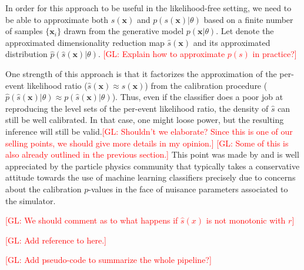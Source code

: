 \documentclass[12pt]{article}
\numberwithin{equation}{section}
\theoremstyle{plain}
\newcommand{\glnote}[1]{\textcolor{red}{[GL: #1]}}
\begin{document}
In order for this approach to be useful in the likelihood-free setting, we need
to be able to approximate both $s(\mathbf{x})$ and $p(s(\mathbf{x})|\theta)$
based on a finite number of samples $\{\mathbf{x}_i\}$ drawn from the generative
model $p(\mathbf{x}|\theta)$.
Let denote the approximated dimensionality
reduction map $\hat{s}(\mathbf{x})$ and its approximated distribution
$\hat{p}(\hat{s}(\mathbf{x})|\theta)$. \glnote{Explain how to approximate $p(s)$ in practice?}

One strength of this approach is that it factorizes the approximation of the
per-event likelihood ratio ($\hat{s}(\mathbf{x}) \approx s(\mathbf{x})$) from
the calibration procedure ($\hat p(\hat s(\mathbf{x})| \theta) \approx
p(\hat{s}(\mathbf{x})|\theta)$). Thus, even if the classifier does a poor job at
reproducing the level sets of the per-event likelihood ratio, the density of
$\hat{s}$ can still be well calibrated. In that case, one might loose power, but
the resulting inference will still be valid.\glnote{Shouldn't we elaborate?
Since this is one of our selling points, we should give more details in my
opinion.} \glnote{Some of this is also already outlined in the previous section.}
This point was made by \cite{Neal:2007zz} and is well appreciated by the
particle physics community that typically takes a conservative attitude towards
the use of machine learning classifiers precisely due to concerns about the
calibration $p$-values in the face of nuisance parameters associated to the
simulator.

\glnote{We should comment as to what happens if $\hat{s}(x)$ is not monotonic with $r$}

\glnote{Add reference to \cite{BiancaZadrozny} here.}

\glnote{Add pseudo-code to summarize the whole pipeline?}
\end{document}
